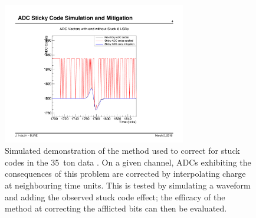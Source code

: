 \begin{figure}
  \centering
  \includegraphics[width=8cm]{stuckbitsremoval.pdf}
  \caption[Simulated demonstration of the method used to correct for stuck codes in the 35~ton data.]{Simulated demonstration of the method used to correct for stuck codes in the 35~ton data \cite{Insler2016}.  On a given channel, ADCs exhibiting the consequences of this problem are corrected by interpolating charge at neighbouring time units.  This is tested by simulating a waveform and adding the observed stuck code effect; the efficacy of the method at correcting the afflicted bits can then be evaluated.}
  \label{fig:StuckBitInterpolation}
\end{figure}

